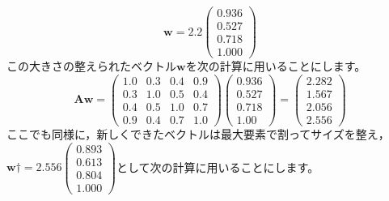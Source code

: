 \documentclass{ltjsbook}
\begin{document}
\[ \bm{w} = 2.2 \begin{pmatrix} 0.936\\ 0.527\\ 0.718\\ 1.000 \end{pmatrix}\]
この大きさの整えられたベクトル$\bm{w}$を次の計算に用いることにします。
\[ \bm{A}\bm{w}=\begin{pmatrix} 1.0 & 0.3 & 0.4 & 0.9\\ 0.3 & 1.0 & 0.5 & 0.4\\  0.4 & 0.5 & 1.0 & 0.7\\ 0.9 & 0.4 & 0.7 & 1.0 \end{pmatrix} \begin{pmatrix} 0.936\\ 0.527\\ 0.718\\ 1.00 \end{pmatrix}=
	\begin{pmatrix} 2.282\\ 1.567\\ 2.056\\ 2.556 \end{pmatrix} \]
ここでも同様に，新しくできたベクトルは最大要素で割ってサイズを整え，$\bm{w}\dagger = 2.556 \begin{pmatrix} 0.893\\ 0.613\\ 0.804\\ 1.000 \end{pmatrix} $として次の計算に用いることにします。
\end{document}
